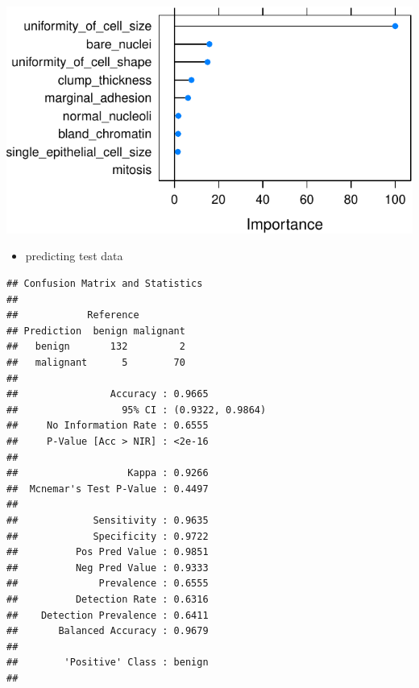 \documentclass[]{article}
\newenvironment{Shaded}{\begin{snugshade}}{\end{snugshade}}
\newcommand{\KeywordTok}[1]{\textcolor[rgb]{0.13,0.29,0.53}{\textbf{{#1}}}}
\newcommand{\NormalTok}[1]{{#1}}
\providecommand{\tightlist}{%
  \setlength{\itemsep}{0pt}\setlength{\parskip}{0pt}}
\begin{document}
\includegraphics{webinar_code_files/figure-latex/importance_xgb-1.pdf}

\begin{itemize}
\tightlist
\item
  predicting test data
\end{itemize}

\begin{Shaded}
\end{Shaded}

\begin{verbatim}
## Confusion Matrix and Statistics
## 
##            Reference
## Prediction  benign malignant
##   benign       132         2
##   malignant      5        70
##                                           
##                Accuracy : 0.9665          
##                  95% CI : (0.9322, 0.9864)
##     No Information Rate : 0.6555          
##     P-Value [Acc > NIR] : <2e-16          
##                                           
##                   Kappa : 0.9266          
##  Mcnemar's Test P-Value : 0.4497          
##                                           
##             Sensitivity : 0.9635          
##             Specificity : 0.9722          
##          Pos Pred Value : 0.9851          
##          Neg Pred Value : 0.9333          
##              Prevalence : 0.6555          
##          Detection Rate : 0.6316          
##    Detection Prevalence : 0.6411          
##       Balanced Accuracy : 0.9679          
##                                           
##        'Positive' Class : benign          
## 
\end{verbatim}
\end{document}
